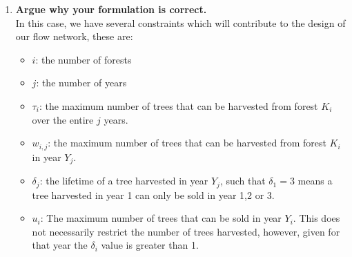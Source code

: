\documentclass[11pt, oneside]{article}   	%
\begin{document}
\begin{enumerate}
\begin{enumerate}
\\
		\item \textbf{Argue why your formulation is correct.}\\
		In this case, we have several constraints which will contribute to the design of our flow network, these are:
		\begin{itemize}
		\item $i$: the number of forests
		\item $j$: the number of years
		\item $\tau_i$: the maximum number of trees that can be harvested from forest $K_i$ over the entire $j$ years.
		\item $w_{i,j}$: the maximum number of trees that can be harvested from forest $K_i$ in year $Y_j$.
		\item $\delta_j$: the lifetime of a tree harvested in year $Y_j$, such that $\delta_1=3$ means a tree harvested in year 1 can only be sold in year 1,2 or 3.
		\item $u_i$: The maximum number of trees that can be sold in year $Y_i$. This does not necessarily restrict the number of trees harvested, however, given for that year the $\delta_i$ value is greater than 1.
		\end{itemize}
		

\end{enumerate}
\end{enumerate}
\end{document}
